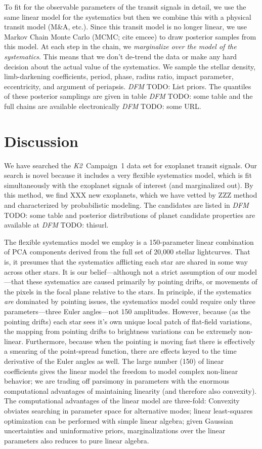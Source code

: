 \documentclass[12pt,preprint]{aastex}
\newcommand{\project}[1]{\textsl{#1}} %
\newcommand{\KT}{\project{K2}}
\newcommand{\todo}[3]{{\color{#2} \emph{#1} TODO: #3}}
\newcommand{\dfmtodo}[1]{\todo{DFM}{red}{#1}}
\begin{document}
To fit for the observable parameters of the transit signals in detail, we use
the same linear model for the systematics but then we combine this with a
physical transit model (M\&A, etc.).
Since this transit model is no longer linear, we use Markov Chain Monte Carlo
(MCMC; cite emcee) to draw posterior samples from this model.
At each step in the chain, we \emph{marginalize over the model of the
systematics}.
This means that we don't de-trend the data or make any hard decision about
the actual value of the systematics.
We sample the stellar density, limb-darkening coefficients, period, phase,
radius ratio, impact parameter, eccentricity, and argument of periapsis.
\dfmtodo{List priors.}
The quantiles of these posterior samplings are given in table \dfmtodo{some
table} and the full chains are available electronically \dfmtodo{some URL}.


\section{Discussion}

We have searched the \KT\ Campaign~1 data set for exoplanet transit signals.
Our search is novel because it includes a very flexible systematics model,
which is fit simultaneously with the exoplanet signals of interest (and
marginalized out).
By this method, we find XXX new exoplanets, which we have vetted by ZZZ
method and characterized by probabilistic modeling.
The candidates are listed in \dfmtodo{some table} and
posterior distributions of planet candidate properties are available at
\dfmtodo{thisurl}.

The flexible systematics model we employ is a 150-parameter linear combination of PCA components
derived from the full set of 20,000 stellar lightcurves.
That is, it presumes that the systematics afflicting each star are shared in
some way across other stars.
It is our belief---although not a strict assumption of our model---that these
systematics are caused primarily by pointing drifts, or movements of the
pixels in the focal plane relative to the stars.
In principle, if the systematics \emph{are} dominated by pointing issues, the
systematics model could require only three parameters---three Euler
angles---not 150 amplitudes.
However, because (as the pointing drifts) each star sees it's own unique
local patch of flat-field variations, the mapping from pointing drifts to
brightness variations can be extremely non-linear.
Furthermore, because when the pointing is moving fast there is effectively
a smearing of the point-spread function, there are effects keyed to the
time derivative of the Euler angles as well.
The large number (150) of linear coefficients gives the linear model the
freedom to model complex non-linear behavior; we are trading off parsimony
in parameters with the enormous computational advantages of maintaining
linearity (and therefore also convexity).
The computational advantages of the linear model are three-fold:
Convexity obviates searching in parameter space for alternative modes;
linear least-squares optimization can be performed with simple linear algebra;
given Gaussian uncertainties and uninformative priors, marginalizations over
the linear parameters also reduces to pure linear algebra.
\end{document}
